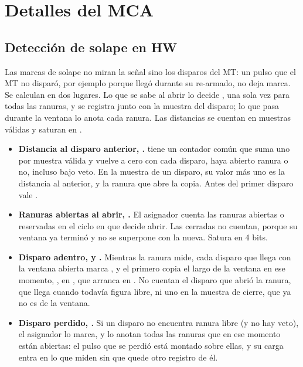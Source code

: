 \chapter{Detalles del MCA}
\label{C:ap-mca-detalles}

\graphicspath{{figs/apendices/}{figs/comunes/}}

\section{Detección de solape en HW}
\label{S:ap-mca-solape}

Las marcas de solape no miran la señal sino los disparos del MT: un pulso que el
MT no disparó, por ejemplo porque llegó durante su re-armado, no deja marca. Se
calculan en dos lugares. Lo que se sabe al abrir lo decide ,
una sola vez para todas las ranuras, y se registra junto con la muestra del
disparo; lo que pasa durante la ventana lo anota cada ranura. Las distancias se
cuentan en muestras válidas y saturan en .
\begin{itemize}
  \item \textbf{Distancia al disparo anterior, .}
     tiene un contador común que suma uno por muestra válida
    y vuelve a cero con cada disparo, haya abierto ranura o no, incluso bajo
    veto. En la muestra de un disparo, su valor más uno es la distancia al
    anterior, y la ranura que abre la copia. Antes del primer disparo vale
    .
  \item \textbf{Ranuras abiertas al abrir, .} El asignador cuenta
    las ranuras abiertas o reservadas en el ciclo en que decide abrir. Las
    cerradas no cuentan, porque su ventana ya terminó y no se superpone con la
    nueva. Satura en 4 bits.
  \item \textbf{Disparo adentro,  y .} Mientras
    la ranura mide, cada disparo que llega con la ventana abierta marca
    , y el primero copia el largo de la ventana en ese momento,
    , en , que arranca en . No
    cuentan el disparo que abrió la ranura, que llega cuando todavía figura
    libre, ni uno en la muestra de cierre, que ya no es de la ventana.
  \item \textbf{Disparo perdido, .} Si un disparo no encuentra
    ranura libre (y no hay veto), el asignador lo marca, y lo anotan todas las
    ranuras que en ese momento están abiertas: el pulso que se perdió está
    montado sobre ellas, y su carga entra en lo que miden sin que quede otro
    registro de él.
\end{itemize}

